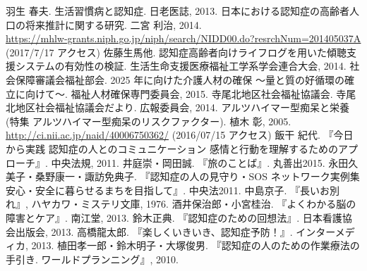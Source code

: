 \documentclass[openany,11pt,papersize]{jsbook}
\begin{document}

\begin{thebibliography}{9}
     羽生 春夫. 生活習慣病と認知症. 日老医誌, 2013.
     日本における認知症の高齢者人口の将来推計に関する研究. 二宮 利治, 2014. \\ \url{https://mhlw-grants.niph.go.jp/niph/search/NIDD00.do?resrchNum=201405037A} (2017/7/17 アクセス)
     佐藤生馬他. 認知症高齢者向けライフログを用いた傾聴支援システムの有効性の検証. 生活生命支援医療福祉工学系学会連合大会, 2014.
     社会保障審議会福祉部会. 2025 年に向けた介護人材の確保 ～量と質の好循環の確立に向けて～. 福祉人材確保専門委員会, 2015.
     寺尾北地区社会福祉協議会. 寺尾北地区社会福祉協議会だより. 広報委員会, 2014.
     アルツハイマー型痴呆と栄養 (特集 アルツハイマー型痴呆のリスクファクター). 植木 彰, 2005. \\ \url{http://ci.nii.ac.jp/naid/40006750362/} (2016/07/15 アクセス)
    \bibitem{} 飯干 紀代. 『今日から実践 認知症の人とのコミュニケーション 感情と行動を理解するためのアプローチ』. 中央法規, 2011.
    \bibitem{} 井庭崇・岡田誠. 『旅のことば』. 丸善出2015.
    \bibitem{} 永田久美子・桑野康一・諏訪免典子. 『認知症の人の見守り・SOS ネットワーク実例集 安心・安全に暮らせるまちを目指して』. 中央法2011.
    \bibitem{} 中島京子. 『長いお別れ』, ハヤカワ・ミステリ文庫, 1976.
    \bibitem{} 酒井保治郎・小宮桂治. 『よくわかる脳の障害とケア』. 南江堂, 2013.
    \bibitem{} 鈴木正典. 『認知症のための回想法』. 日本看護協会出版会, 2013.
    \bibitem{} 高橋龍太郎. 『楽しくいきいき、認知症予防！』. インターメディカ, 2013.
    \bibitem{} 植田孝一郎・鈴木明子・大塚俊男. 『認知症の人のための作業療法の手引き. ワールドプランニング』, 2010.
\end{thebibliography}
\end{document}

